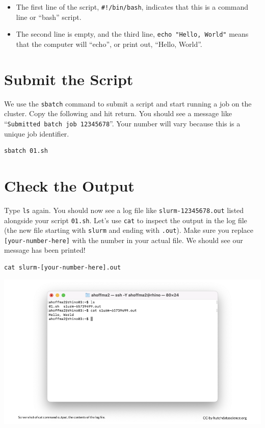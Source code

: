 \documentclass[
]{book}
\providecommand{\tightlist}{%
  \setlength{\itemsep}{0pt}\setlength{\parskip}{0pt}}
\begin{document}
\begin{itemize}
\tightlist
\item
  The first line of the script, \texttt{\#!/bin/bash}, indicates that this is a command line or ``bash'' script.
\item
  The second line is empty, and the third line, \texttt{echo\ "Hello,\ World"} means that the computer will ``echo'', or print out, ``Hello, World''.
\end{itemize}

\hypertarget{submit-the-script}{%
\section{Submit the Script}\label{submit-the-script}}

We use the \texttt{sbatch} command to submit a script and start running a job on the cluster. Copy the following and hit return. You should see a message like ``\texttt{Submitted\ batch\ job\ 12345678}''. Your number will vary because this is a unique job identifier.

\begin{verbatim}
sbatch 01.sh
\end{verbatim}

\hypertarget{check-the-output}{%
\section{Check the Output}\label{check-the-output}}

Type \texttt{ls} again. You should now see a log file like \texttt{slurm-12345678.out} listed alongside your script \texttt{01.sh}. Let's use \texttt{cat} to inspect the output in the log file (the new file starting with \texttt{slurm} and ending with \texttt{.out}). Make sure you replace \texttt{{[}your-number-here{]}} with the number in your actual file. We should see our message has been printed!

\begin{verbatim}
cat slurm-[your-number-here].out
\end{verbatim}

\includegraphics[width=1\linewidth]{resources/images/05-first-job_files/figure-latex//1BQxrVYdKZTbpCaF-i_q9w7s9x034lEXpQZDU-Sl09cs_g1579ffd7b01_12_22}
\end{document}
